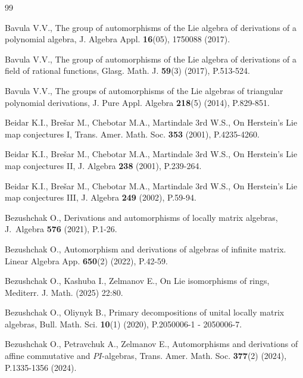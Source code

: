 \documentclass[12pt,a4paper]{amsart}
\theoremstyle{plain}
\begin{document}
	
	\begin{thebibliography}{99}
		
		 Bavula V.V., The group of automorphisms of the Lie algebra of derivations of a polynomial algebra, J. Algebra Appl. \textbf{16}(05), 1750088 (2017).
		
		 Bavula V.V., The group of automorphisms of the Lie algebra of derivations of a field of rational functions, Glasg. Math. J. \textbf{59}(3) (2017), P.513-524.
		
		 Bavula V.V., The groups of automorphisms of the Lie algebras of triangular  polynomial derivations, J. Pure Appl. Algebra \textbf{218}(5) (2014), P.829-851.
		
		 Beidar K.I., Bre\v{s}ar M., Chebotar M.A.,  Martindale 3rd W.S.,  On Herstein's Lie map conjectures I, Trans. Amer. Math. Soc. \textbf{353} (2001), P.4235-4260.
		
		 Beidar K.I., Bre\v{s}ar M., Chebotar M.A.,  Martindale 3rd W.S.,  On Herstein's Lie map conjectures II, J. Algebra \textbf{238} (2001), P.239-264.
		
		 Beidar K.I., Bre\v{s}ar M., Chebotar M.A.,  Martindale 3rd W.S.,  On Herstein's Lie map conjectures III, J. Algebra \textbf{249} (2002), P.59-94.
		
		
		
		 Bezushchak O., Derivations and automorphisms of locally matrix algebras, J.~Algebra  \textbf{576} (2021), P.1-26. 
		
		
		
		
		 Bezushchak O., Automorphism and derivations of algebras of infinite matrix. Linear Algebra App. \textbf{650}(2) (2022), P.42-59.
		

		
		 Bezushchak O., Kashuba I., Zelmanov E., On Lie isomorphisms of rings, Mediterr. J. Math. (2025) 22:80.
		
		 Bezushchak O., Oliynyk B., Primary decompositions of unital locally matrix algebras, Bull. Math. Sci. \textbf{10}(1) (2020), P.2050006-1 - 2050006-7.
		
		
		 Bezushchak O., Petravchuk A., Zelmanov E., Automorphisms and derivations of affine commutative and $PI$-algebras, Trans. Amer. Math. Soc. \textbf{377}(2) (2024), P.1335-1356 (2024).  
		

\end{thebibliography}
\end{document}
